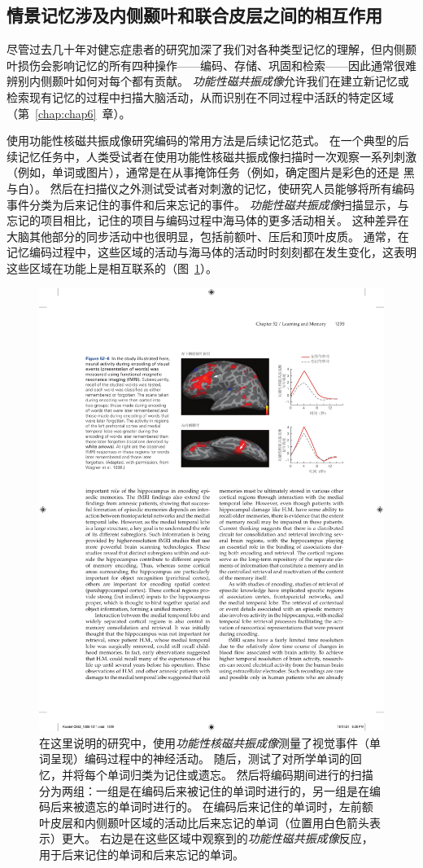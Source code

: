 \subsection{情景记忆涉及内侧颞叶和联合皮层之间的相互作用}

尽管过去几十年对健忘症患者的研究加深了我们对各种类型记忆的理解，但内侧颞叶损伤会影响记忆的所有四种操作——编码、存储、巩固和检索——因此通常很难辨别内侧颞叶如何对每个都有贡献。
\textit{功能性磁共振成像}允许我们在建立新记忆或检索现有记忆的过程中扫描大脑活动，从而识别在不同过程中活跃的特定区域（第~\ref{chap:chap6}~章）。


使用功能性核磁共振成像研究编码的常用方法是后续记忆范式。
在一个典型的后续记忆任务中，人类受试者在使用功能性核磁共振成像扫描时一次观察一系列刺激（例如，单词或图片），通常是在从事掩饰任务（例如，确定图片是彩色的还是 黑与白）。
然后在扫描仪之外测试受试者对刺激的记忆，使研究人员能够将所有编码事件分类为后来记住的事件和后来忘记的事件。
\textit{功能性磁共振成像}扫描显示，与忘记的项目相比，记住的项目与编码过程中海马体的更多活动相关。
这种差异在大脑其他部分的同步活动中也很明显，包括前额叶、压后和顶叶皮质。
通常，在记忆编码过程中，这些区域的活动与海马体的活动时时刻刻都在发生变化，这表明这些区域在功能上是相互联系的（图~\ref{fig:52_6}）。


\begin{figure}[htbp]
	\centering
	\includegraphics[width=0.7\linewidth]{chap52/fig_52_6}
	\caption{在这里说明的研究中，使用\textit{功能性核磁共振成像}测量了视觉事件（单词呈现）编码过程中的神经活动。
		随后，测试了对所学单词的回忆，并将每个单词归类为记住或遗忘。
		然后将编码期间进行的扫描分为两组：一组是在编码后来被记住的单词时进行的，另一组是在编码后来被遗忘的单词时进行的。
		在编码后来记住的单词时，左前额叶皮层和内侧颞叶区域的活动比后来忘记的单词（位置用白色箭头表示）更大。
		右边是在这些区域中观察到的\textit{功能性磁共振成像}反应，用于后来记住的单词和后来忘记的单词\cite{wagner1998building}。}
	\label{fig:52_6}
\end{figure}


